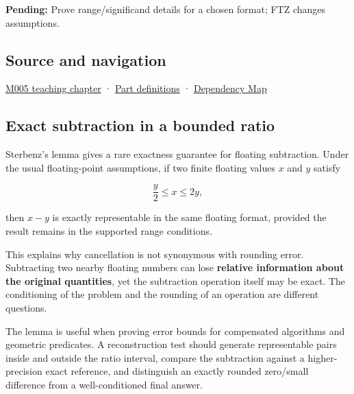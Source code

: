 \textbf{Pending:} Prove range/significand details for a chosen format; FTZ changes assumptions.

\subsection{Source and navigation}\label{appendix-399b7ad53f39-source-and-navigation}

\hyperref[01-foundations-i-ch001-when-arithmetic-meets-uncertainty]{M005 teaching chapter} · \hyperref[appendix-fd090d982a15-m005---parts-77-88]{Part definitions} · \hyperref[appendix-4ad47bdd269a]{Dependency Map}

\subsection{Exact subtraction in a bounded ratio}\label{appendix-399b7ad53f39-exact-subtraction-in-a-bounded-ratio}

Sterbenz's lemma gives a rare exactness guarantee for floating subtraction. Under the usual floating-point assumptions, if two finite floating values \(x\) and \(y\) satisfy

\[
\frac{y}{2} \le x \le 2y,
\]

then \(x-y\) is exactly representable in the same floating format, provided the result remains in the supported range conditions.

This explains why cancellation is not synonymous with rounding error. Subtracting two nearby floating numbers can lose \textbf{relative information about the original quantities}, yet the subtraction operation itself may be exact. The conditioning of the problem and the rounding of an operation are different questions.

The lemma is useful when proving error bounds for compensated algorithms and geometric predicates. A reconstruction test should generate representable pairs inside and outside the ratio interval, compare the subtraction against a higher-precision exact reference, and distinguish an exactly rounded zero/small difference from a well-conditioned final answer.
